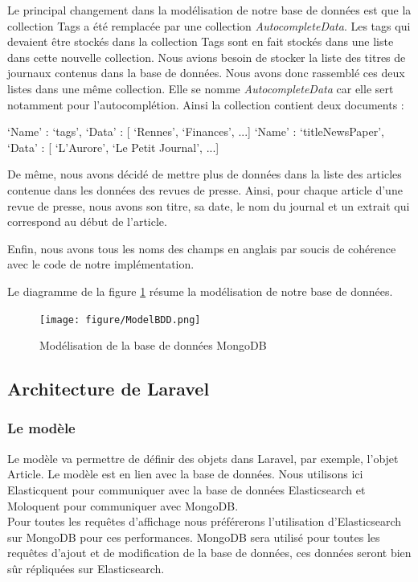 Le principal changement dans la modélisation de notre base de données est que la collection Tags a été remplacée par une collection \textit{AutocompleteData}. Les tags qui devaient être stockés dans la collection Tags sont en fait stockés dans une liste dans cette nouvelle collection. Nous avions besoin de stocker la liste des titres de journaux contenus dans la base de données. Nous avons donc rassemblé ces deux listes dans une même collection. Elle se nomme \textit{AutocompleteData} car elle sert notamment pour l'autocomplétion. Ainsi la collection contient deux documents :

\begin{verbatimtab}[3]
{
	‘Name’ : ‘tags’,
	‘Data’ : [ ‘Rennes’, ‘Finances’, ...]
}
{
	‘Name’ : ‘titleNewsPaper’,
	‘Data’ : [ ‘L'Aurore’, ‘Le Petit Journal’, ...]
}
\end{verbatimtab}


De même, nous avons décidé de mettre plus de données dans la liste des articles contenue dans les données des revues de presse. Ainsi, pour chaque article d'une revue de presse, nous avons son titre, sa date, le nom du journal et un extrait qui correspond au début de l'article.

Enfin, nous avons tous les noms des champs en anglais par soucis de cohérence avec le code de notre implémentation.

Le diagramme de la figure \ref{modelbdd} résume la modélisation de notre base de données.

\begin{figure}[H]
        \centering
        \texttt{[image: figure/ModelBDD.png]}
            \caption{Modélisation de la base de données MongoDB}
            \label{modelbdd}
\end{figure}

\subsection{Architecture de Laravel}

\subsubsection{Le modèle}

\begin{leftonly}
	Le modèle va permettre de définir des objets dans Laravel, par exemple, l'objet Article. Le modèle est en lien avec la base de données. Nous utilisons ici Elasticquent\cite{GitElasticquent} pour communiquer avec la base de données Elasticsearch et Moloquent\cite{GitLaravelMongo} pour communiquer avec MongoDB.\\ Pour toutes les requêtes d'affichage nous préférerons l'utilisation d'Elasticsearch sur MongoDB pour ces performances. MongoDB sera utilisé pour toutes les requêtes d'ajout et de modification de la base de données, ces données seront bien sûr répliquées sur Elasticsearch.
\end{leftonly}

